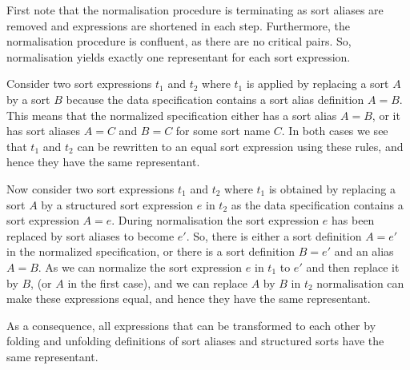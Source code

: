 \documentclass{article}
\begin{document}
First note that the normalisation procedure is terminating as sort aliases
are removed and expressions are shortened in each step. Furthermore, the normalisation
procedure is confluent, as there are no critical pairs. So, normalisation yields exactly
one representant for each sort expression.

Consider two sort expressions $t_1$ and $t_2$ where $t_1$ is applied by replacing a sort $A$
by a sort $B$ because the data specification contains a sort alias definition $A=B$. This means
that the normalized specification either has a sort alias $A=B$, or it has sort aliases
$A=C$ and $B=C$ for some sort name $C$. In both cases we see that $t_1$ and $t_2$ can be rewritten
to an equal sort expression using these rules, and hence they have the same representant.

Now consider two sort expressions $t_1$ and $t_2$ where $t_1$ is obtained by replacing
a sort $A$ by a structured sort expression $e$ in $t_2$ as the data specification contains
a sort expression $A=e$. During normalisation the sort expression $e$ has been replaced by
sort aliases to become $e'$. So, there is either a sort definition $A=e'$ in the normalized
specification, or there is a sort definition $B=e'$ and an alias $A=B$. As we can normalize
the sort expression $e$ in $t_1$ to $e'$ and then replace it by $B$, (or $A$ in the first case),
and we can replace  $A$ by $B$ in $t_2$ normalisation can make these expressions equal, and
hence they have the same representant.

As a consequence, all expressions that can be transformed to each other
by folding and unfolding definitions of sort aliases and structured sorts have the
same representant.
\end{document}
